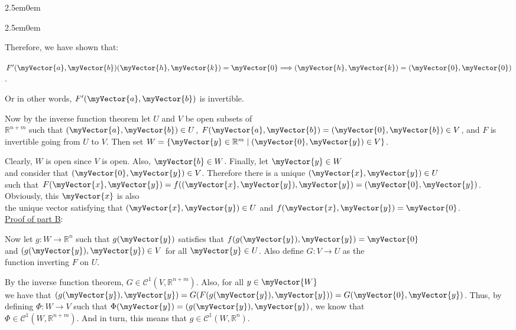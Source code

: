 \documentclass{book}
\newenvironment{myIndent}{%
   \begin{adjustwidth}{2.5em}{0em}%
}{%
   \end{adjustwidth}%
}
\newcommand{\retTwo}{\hfill\bigbreak}
\newcommand{\mVec}[1]{\myVector{#1}}
\begin{document}
{\begin{myIndent}
{\begin{myIndent}
      Therefore, we have shown that:
      
      {\centering $F^\prime(\mVec{a}, \mVec{b})(\mVec{h}, \mVec{k}) = \mVec{0} \Longrightarrow (\mVec{h}, \mVec{k}) = (\mVec{0}, \mVec{0})$.\retTwo\par}

      Or in other words, $F^\prime(\mVec{a}, \mVec{b})$ is invertible.\retTwo

      Now by the inverse function theorem let $U$ and $V$ be open subsets of\\ $\mathbb{R}^{n + m}$ such that $(\mVec{a}, \mVec{b}) \in U$,\hspace{0.4em} $F(\mVec{a}, \mVec{b}) = (\mVec{0}, \mVec{b}) \in V$, and $F$ is\\ invertible going from $U$ to $V$. Then set $W = \{\mVec{y} \in \mathbb{R}^m \mid (\mVec{0}, \mVec{y}) \in V\}$.\retTwo

      Clearly, $W$ is open since $V$ is open. Also, $\mVec{b} \in W$. Finally, let $\mVec{y} \in W$\\ and consider that $(\mVec{0}, \mVec{y}) \in V$. Therefore there is a unique $(\mVec{x}, \mVec{y}) \in U$\\ such that $F(\mVec{x}, \mVec{y}) = f((\mVec{x}, \mVec{y}), \mVec{y}) = (\mVec{0}, \mVec{y})$. Obviously, this $\mVec{x}$ is also\\ the unique vector satisfying that $(\mVec{x}, \mVec{y}) \in U$ and $f(\mVec{x}, \mVec{y}) = \mVec{0}$.\\ [9pt]

      \ul{Proof of part B}:\retTwo

      Now let $g: W \longrightarrow \mathbb{R}^n$ such that $g(\mVec{y})$ satisfies that $f(g(\mVec{y}), \mVec{y}) = \mVec{0}$\\ and $(g(\mVec{y}), \mVec{y}) \in V$ for all $\mVec{y} \in U$. Also define $G: V \longrightarrow U$ as the\\ function inverting $F$ on $U$.

      \newpage

      By the inverse function theorem, $G \in \mathscr{C}^1(V, \mathbb{R}^{n + m})$. Also, for all $y \in \mVec{W}$\\ we have that $(g(\mVec{y}), \mVec{y}) = G(F(g(\mVec{y}), \mVec{y})) = G(\mVec{0}, \mVec{y})$. Thus, by\\ defining $\Phi: W \longrightarrow V$ such that $\Phi(\mVec{y}) = (g(\mVec{y}), \mVec{y})$, we know that\\ $\Phi \in \mathscr{C}^1(W, \mathbb{R}^{n + m})$. And in turn, this means that $g \in \mathscr{C}^1(W, \mathbb{R}^n)$.\retTwo


\end{myIndent}}
\end{myIndent}}
\end{document}
